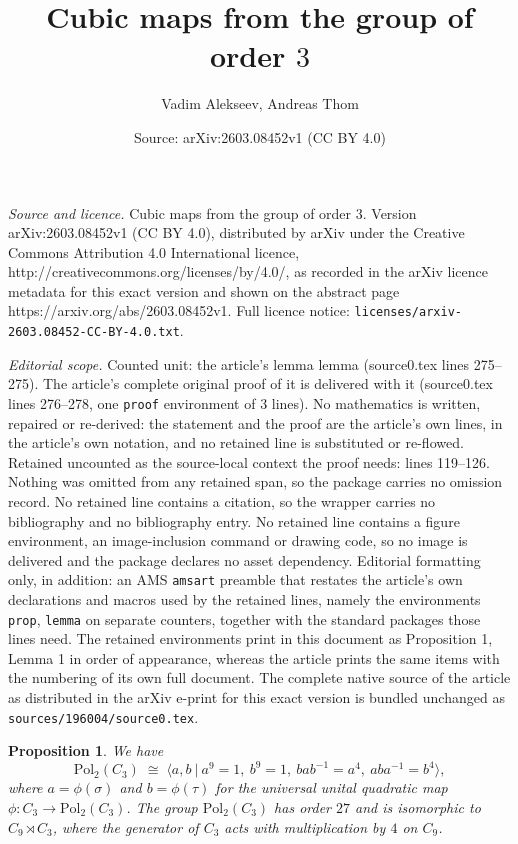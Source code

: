 \documentclass[10pt,a4paper]{amsart}
\title{Cubic maps from the group of order $3$}
\author{Vadim Alekseev, Andreas Thom}
\date{Source: arXiv:2603.08452v1 (CC BY 4.0)}
\newtheorem{prop}{Proposition}
\begin{document}
\maketitle

\noindent\emph{Source and licence.} Cubic maps from the group of order $3$. Version arXiv:2603.08452v1 (CC BY 4.0), distributed by arXiv under the Creative Commons Attribution 4.0 International licence, http://creativecommons.org/licenses/by/4.0/, as recorded in the arXiv licence metadata for this exact version and shown on the abstract page https://arxiv.org/abs/2603.08452v1. Full licence notice: \texttt{licenses/arxiv-2603.08452-CC-BY-4.0.txt}.\par\smallskip

\noindent\textit{Editorial scope.} Counted unit: the article's lemma lemma (source0.tex lines 275--275). The article's complete original proof of it is delivered with it (source0.tex lines 276--278, one \texttt{proof} environment of 3 lines). No mathematics is written, repaired or re-derived: the statement and the proof are the article's own lines, in the article's own notation, and no retained line is substituted or re-flowed.  Retained uncounted as the source-local context the proof needs: lines 119--126.  Nothing was omitted from any retained span, so the package carries no omission record.  No retained line contains a citation, so the wrapper carries no bibliography and no bibliography entry.  No retained line contains a figure environment, an image-inclusion command or drawing code, so no image is delivered and the package declares no asset dependency.  Editorial formatting only, in addition: an AMS \texttt{amsart} preamble that restates the article's own declarations and macros used by the retained lines, namely the environments \texttt{prop}, \texttt{lemma} on separate counters, together with the standard packages those lines need.  The retained environments print in this document as Proposition 1, Lemma 1 in order of appearance, whereas the article prints the same items with the numbering of its own full document.  The complete native source of the article as distributed in the arXiv e-print for this exact version is bundled unchanged as \texttt{sources/196004/source0.tex}.
\begin{prop}\label{prop:Pol2C3-symmetric}
We have
\begin{equation}\label{eq:symmetric}
\mathrm{Pol}_2(C_3)\;\cong\;\Big\langle a,b\ \Big|\ a^9=1,\ b^9=1,\ bab^{-1}=a^4,\ aba^{-1}=b^4\Big\rangle,
\end{equation}
where $a=\phi(\sigma)$ and $b=\phi(\tau)$ for the universal unital quadratic map
$\phi:C_3\to \mathrm{Pol}_2(C_3)$. The group $\mathrm{Pol}_2(C_3)$ has order $27$ and is isomorphic to $C_9 \rtimes C_3$, where the generator of $C_3$ acts with multiplication by $4$ on $C_9$.
\end{prop}
\end{document}
